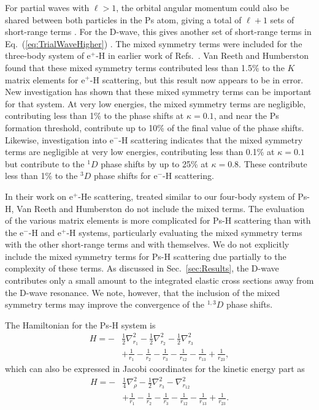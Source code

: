 \documentclass[preprint,showpacs,showkeys,preprintnumbers,amsmath,amssymb,longbibliography,pra,aps]{revtex4-1}
\begin{document}
For partial waves with $\ell>1$, the orbital angular momentum could also be 
shared between both particles in the Ps atom, giving a total of
$\ell + 1$ sets of short-range terms \cite{Schwartz1961a}. For the
D-wave, this gives another set of short-range terms in
Eq.~(\ref{eq:TrialWaveHigher})
\cite{Humberston1997,VanReethThesis,BrownThesis}.
The mixed symmetry terms were included for the three-body system of e$^+$-H
in earlier work of
Refs.~\cite{Brown1985a,BrownThesis,WattsThesis,Humberston1997,VanReeth1997}.
Van Reeth and Humberston \cite{VanReeth1997} found that these
mixed symmetry terms contributed less than 1.5\% to the $K$ matrix elements
for e$^+$-H scattering, but this result now appears to be in error.
New investigation \cite{VanReeth2015} has shown 
that these mixed symmetry terms can be important for that 
system. At very low energies, the mixed symmetry terms are negligible,
contributing less than 1\% to the phase shifts at $\kappa = 0.1$, and near
the Ps formation threshold, contribute up to 10\%
of the final value of the phase shifts.
Likewise, investigation into e$^-$-H scattering
\cite{VanReeth2015} indicates that the mixed symmetry terms are negligible
at very low
energies, contributing less than 0.1\% at $\kappa = 0.1$ but contribute to the
$^1D$ phase shifts by up to 25\% at $\kappa = 0.8$. These contribute less than
1\% to the $^3D$ phase shifts for e$^-$-H scattering.

In their work on e$^+$-He scattering, treated similar to our four-body system
of Ps-H, Van Reeth and Humberston \cite{VanReeth1999} do not include the mixed
terms. The evaluation of the various matrix elements is more complicated for
Ps-H scattering than with the e$^-$-H and e$^+$-H systems,
particularly evaluating the mixed symmetry terms with the 
other short-range terms and with themselves. 
We do not explicitly include the mixed symmetry terms for Ps-H scattering due 
partially to the complexity of these terms. As discussed in
Sec.~\ref{sec:Results}, the D-wave contributes only a small amount to the
integrated 
elastic cross sections away from the D-wave resonance. We note, however, that 
the inclusion of the mixed symmetry terms may improve the convergence of the $^{1,3}D$ 
phase shifts.


The Hamiltonian for the Ps-H system is
\begin{align}
H = -&\frac{1}{2} \nabla_{r_1}^2 - \frac{1}{2} \nabla_{r_2}^2 - \frac{1}{2}
  \nabla_{r_3}^2  \nonumber \\
&+ \frac{1}{r_1} - \frac{1}{r_2} - \frac{1}{r_3} - \frac{1}{r_{12}} -
  \frac{1}{r_{13}}+\frac {1}{r_{23}},
\label{eq:Hamiltonian1}
\end{align}
which can also be expressed in Jacobi coordinates for the kinetic energy
part as
\begin{align}
H = -&\frac{1}{4} \nabla_{\rho}^2 - \frac{1}{2} \nabla_{r_3}^2 -
  \nabla_{r_{12}}^2  \nonumber \\
&+ \frac{1}{r_1} - \frac{1}{r_2} - \frac{1}{r_3} - \frac{1}{r_{12}} -
  \frac{1}{r_{13}}+\frac{1}{r_{23}}.
\label{eq:Hamiltonian2}
\end{align}
\end{document}
